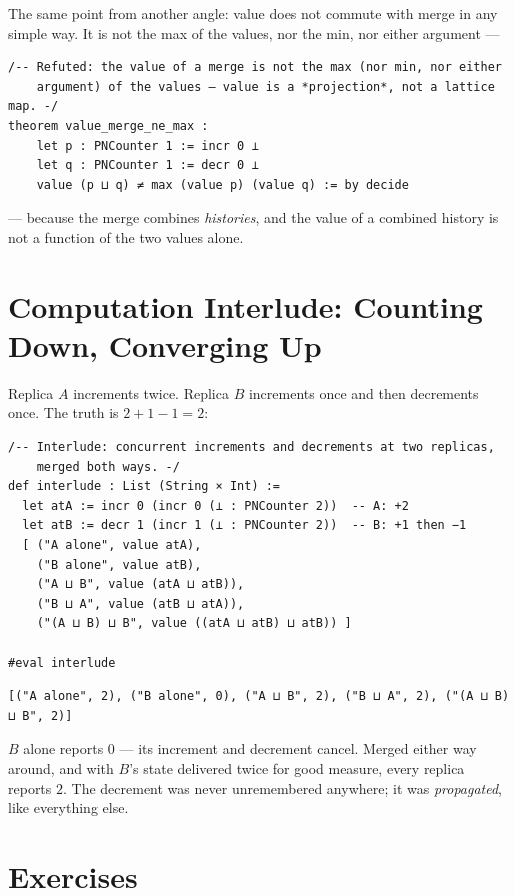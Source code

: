 \documentclass[12pt, a4paper, openright]{book}
\theoremstyle{thmstyle}
\theoremstyle{defstyle}
\begin{document}
The same point from another angle: value does not commute with merge in
any simple way. It is not the max of the values, nor the min, nor either
argument ---

\begin{verbatim}
/-- Refuted: the value of a merge is not the max (nor min, nor either
    argument) of the values — value is a *projection*, not a lattice map. -/
theorem value_merge_ne_max :
    let p : PNCounter 1 := incr 0 ⊥
    let q : PNCounter 1 := decr 0 ⊥
    value (p ⊔ q) ≠ max (value p) (value q) := by decide
\end{verbatim}

--- because the merge combines \emph{histories}, and the value of a
combined history is not a function of the two values alone.

\FloatBarrier
\section{Computation Interlude: Counting Down, Converging Up}

Replica $A$ increments twice. Replica $B$ increments once and then
decrements once. The truth is $2 + 1 - 1 = 2$:

\begin{verbatim}
/-- Interlude: concurrent increments and decrements at two replicas,
    merged both ways. -/
def interlude : List (String × Int) :=
  let atA := incr 0 (incr 0 (⊥ : PNCounter 2))  -- A: +2
  let atB := decr 1 (incr 1 (⊥ : PNCounter 2))  -- B: +1 then −1
  [ ("A alone", value atA),
    ("B alone", value atB),
    ("A ⊔ B", value (atA ⊔ atB)),
    ("B ⊔ A", value (atB ⊔ atA)),
    ("(A ⊔ B) ⊔ B", value ((atA ⊔ atB) ⊔ atB)) ]

#eval interlude
\end{verbatim}

\begin{verbatim}
[("A alone", 2), ("B alone", 0), ("A ⊔ B", 2), ("B ⊔ A", 2), ("(A ⊔ B) ⊔ B", 2)]
\end{verbatim}

$B$ alone reports $0$ --- its increment and decrement cancel. Merged
either way around, and with $B$'s state delivered twice for good
measure, every replica reports $2$. The decrement was never unremembered
anywhere; it was \emph{propagated}, like everything else.

\section{Exercises}
\end{document}
